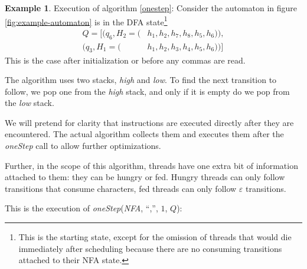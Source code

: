 \documentclass[english]{sigplanconf}
\theoremstyle{definition}
\newtheorem{example}{Example}[section]
\begin{document}
\begin{example} Execution of algorithm \ref{onestep}: \label{ex:oneStep1}
Consider the automaton in figure \ref{fig:example-automaton} is in
the DFA state\footnote{This is the starting state, except for the omission of threads 
that would die immediately after scheduling because there are no consuming
transitions attached to their NFA state.}
\begin{align*}
Q=[
	(q_6, H_2=(&h_1, h_2, h_7,  h_8, h_5, h_6)), \\
	(q_3, H_1=(&h_1, h_2, h_3,  h_4, h_5, h_6))]
	\end{align*}
This is the case after initialization or before any commas are read.

The algorithm uses two stacks, \emph{high} and \emph{low}.
To find the next transition to follow, we pop one from the \emph{high} stack,
and only if it is empty do we pop from the \emph{low} stack.

We will pretend for clarity that instructions are executed directly
after they are encountered.  The actual algorithm collects them and
executes them after the \emph{oneStep} call to allow further
optimizations.  

Further, in the scope of this algorithm, threads have one extra bit of information attached to them:
they can be hungry or fed. Hungry threads can only follow transitions that consume characters,
fed threads can only follow $\varepsilon$ transitions.

This is the execution of \emph{oneStep}(\emph{NFA},
``,'', $1$, $Q$):


\end{example}
\end{document}
